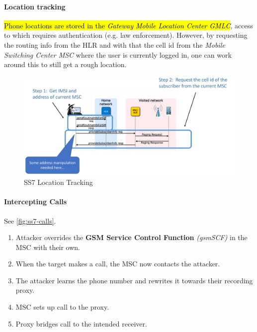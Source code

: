\paragraph{Location tracking}
\hl{Phone locations are stored in the \textit{Gateway Mobile Location Center GMLC}},
access to which requires authentication (e.g. law enforcement). However, by
requesting the routing info from the HLR and with that the cell id from the
\textit{Mobile Switching Center MSC} where the user is currently logged in, one
can work around this to still get a rough location.

\begin{figure}[h]
	\centering
	\includegraphics[scale=0.4]{images/10-ss7-location.png}
	\caption{SS7 Location Tracking}
	\label{fig:ss7-location}
\end{figure}

\paragraph{Intercepting Calls}
See \autoref{fig:ss7-calls}.
\begin{enumerate}
	\item Attacker overrides the \textbf{GSM Service Control Function} \textit{(gsmSCF)} in the
	      MSC with their own.
	\item When the target makes a call, the MSC now contacts the attacker.
	\item The attacker learns the phone number and rewrites it towards their recording
	      proxy.
	\item MSC sets up call to the proxy.
	\item Proxy bridges call to the intended receiver.
\end{enumerate}

